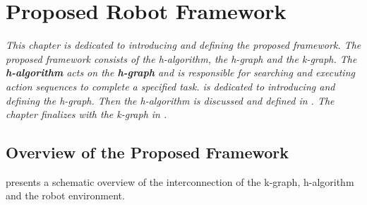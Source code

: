 
 
\chapter{Proposed Robot Framework}%
\label{chap:h-graph_and_k-graph}
\textit{This chapter is dedicated to introducing and defining the proposed framework. The proposed framework consists of the \acl{h-algorithm}, the \acl{h-graph} and the \acl{k-graph}. The \textbf{\acf{h-algorithm}} acts on the \textbf{\acf{h-graph}} and is responsible for searching and executing action sequences to complete a specified task.  is dedicated to introducing and defining the \ac{h-graph}. Then the \ac{h-algorithm} is discussed and defined in . The chapter finalizes with the \ac{k-graph} in .\bs}

\section{Overview of the Proposed Framework}
 presents a schematic overview of the interconnection of the \ac{k-graph}, \ac{h-algorithm} and the robot environment.\bs

